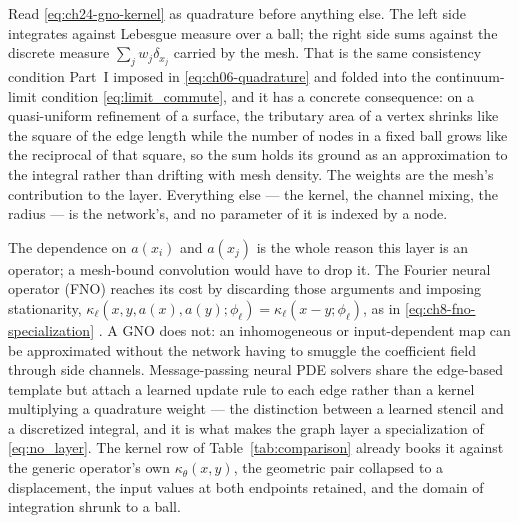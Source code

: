 Read \eqref{eq:ch24-gno-kernel} as quadrature before anything else. The left side integrates
against Lebesgue measure over a ball; the right side sums against the discrete measure $\sum_j
w_j \delta_{x_j}$ carried by the mesh. That is the same consistency condition Part~I imposed
in \eqref{eq:ch06-quadrature} and folded into the continuum-limit condition
\eqref{eq:limit_commute},
and it has a concrete consequence: on a quasi-uniform refinement of a surface, the tributary
area of a vertex shrinks like the square of the edge length while the number of nodes in a
fixed ball grows like the reciprocal of that square, so the sum holds its ground as an
approximation to the integral rather than drifting with mesh density. The weights are the
mesh's contribution to the layer. Everything else --- the kernel, the channel mixing, the
radius --- is the network's, and no parameter of it is indexed by a node.

The dependence on $a(x_i)$ and $a(x_j)$ is the whole reason this layer is an operator; a
mesh-bound convolution would have to drop it. The Fourier neural operator (FNO)
reaches its cost by discarding those arguments and imposing stationarity,
$\kappa_\ell(x,y,a(x),a(y);\phi_\ell) = \kappa_\ell(x-y;\phi_\ell)$, as in
\eqref{eq:ch8-fno-specialization} \cite{li2021fourier}. A GNO does not: an inhomogeneous or
input-dependent map can be approximated without the network having to smuggle the coefficient
field through side channels. Message-passing neural PDE solvers \cite{brandstetter2022message}
share the edge-based template but attach a learned update rule to each edge rather than a
kernel multiplying a quadrature weight --- the distinction between a
learned stencil and a discretized integral, and it is what makes the graph layer a
specialization of \eqref{eq:no_layer}. The kernel row of
Table~\ref{tab:comparison} already books it against the generic operator's own
$\kappa_\theta(x,y)$, the geometric pair collapsed to a displacement, the input values at both
endpoints retained, and the domain of integration shrunk to a ball.

